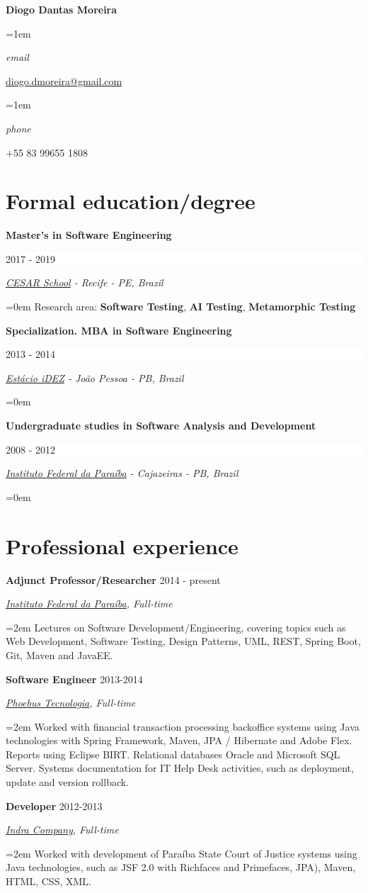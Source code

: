 \documentclass[a4paper,10pt]{article}
\newlength{\spacebox}
\newcommand{\sepspace}{\vspace*{0.5em}}
\newcommand{\Name}[1]{\noindent\huge\textbf{#1}\normalsize\normalfont}
\newcommand{\NewPart}[1]{ \section*{\large {#1}}}
\newcommand{\PersonalEntry}[2]{
		\noindent\hangindent=1em\hangafter=0 		%
		\parbox{\spacebox}{							%
		\textit{#1}}								%
		\hspace{0em} #2 \par}						%
\newcommand{\EducationEntry}[4]{
		\noindent \textbf{#1} \hfill 					%
		\colorbox{White}{%
			\parbox{6em}{%
			\hfill\color{Black}#2}} \par				%
		\noindent \textit{#3} \par						%
		\noindent\hangindent=0em\hangafter=0 \normalsize #4 	%
		\normalsize \par}
\newcommand{\WorkEntry}[4]{								%
		\noindent \textbf{#1} \hfill 					%
		\colorbox{White}{\color{Black}#2} \par			%
		\noindent \textit{#3} \par						%
		\noindent\hangindent=2em\hangafter=0 \normalsize #4 	%
		\normalsize \par}
\begin{document}
\Name{Diogo Dantas Moreira}


\sepspace

\PersonalEntry{email}{\href{mailto:diogo.dmoreira@gmail.com}{diogo.dmoreira@gmail.com}}
\PersonalEntry{phone}{+55 83 99655 1808}

\NewPart{Formal education/degree}{} 
\EducationEntry{Master's in Software Engineering}{2017 - 2019}{\href{https://cesar.school/}{CESAR School} - Recife - PE, Brazil}{Research area: \textbf{Software Testing}, \textbf{AI Testing}, \textbf{Metamorphic Testing}}
\sepspace
\sepspace
\EducationEntry{Specialization. MBA in Software Engineering}{2013 - 2014}{\href{https://estacio.br/}{Estácio iDEZ} - João Pessoa - PB, Brazil}{}
\EducationEntry{Undergraduate studies in Software Analysis and Development}{2008 - 2012}{\href{https://www.ifpb.edu.br/}{Instituto Federal da Paraíba} - Cajazeiras - PB, Brazil}{}

\NewPart{Professional experience}{}

\WorkEntry{Adjunct Professor/Researcher}{2014 - present}{\href{https://www.ifpb.edu.br/}{Instituto Federal da Paraíba}, Full-time}{Lectures on Software Development/Engineering, covering topics such as Web Development, Software Testing, Design Patterns, UML, REST, Spring Boot, Git, Maven and JavaEE.}
\sepspace

\WorkEntry{Software Engineer}{2013-2014}{\href{http://www.phoebus.com.br/}{Phoebus Tecnologia}, Full-time}{Worked with financial transaction processing backoffice systems using Java technologies with Spring Framework, Maven, JPA / Hibernate and Adobe Flex. Reports using Eclipse BIRT. Relational databases Oracle and Microsoft SQL Server. Systems documentation for IT Help Desk activities, such as deployment, update and version rollback.} 
\sepspace

\WorkEntry{Developer}{2012-2013}{\href{https://www.indracompany.com/es/pais/brasil}{Indra Company}, Full-time}{Worked with development of Paraíba State Court of Justice systems using Java technologies, such as JSF 2.0 with Richfaces and Primefaces, JPA), Maven, HTML, CSS, XML.}
\sepspace

\end{document}
